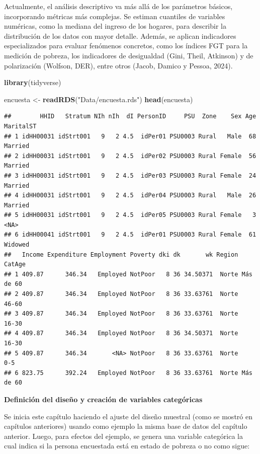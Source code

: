 \documentclass[
  spanish,
  12pt,
]{book}
\newenvironment{Shaded}{\begin{snugshade}}{\end{snugshade}}
\newcommand{\FunctionTok}[1]{\textcolor[rgb]{0.13,0.29,0.53}{\textbf{#1}}}
\newcommand{\NormalTok}[1]{#1}
\newcommand{\OtherTok}[1]{\textcolor[rgb]{0.56,0.35,0.01}{#1}}
\newcommand{\StringTok}[1]{\textcolor[rgb]{0.31,0.60,0.02}{#1}}
\begin{document}
Actualmente, el análisis descriptivo va más allá de los parámetros básicos, incorporando métricas más complejas. Se estiman cuantiles de variables numéricas, como la mediana del ingreso de los hogares, para describir la distribución de los datos con mayor detalle. Además, se aplican indicadores especializados para evaluar fenómenos concretos, como los índices FGT para la medición de pobreza, los indicadores de desigualdad (Gini, Theil, Atkinson) y de polarización (Wolfson, DER), entre otros (Jacob, Damico y Pessoa, 2024).

\begin{Shaded}
\begin{Highlighting}[]
\FunctionTok{library}\NormalTok{(tidyverse)}

\NormalTok{encuesta }\OtherTok{\textless{}{-}} \FunctionTok{readRDS}\NormalTok{(}\StringTok{"Data/encuesta.rds"}\NormalTok{)}
\FunctionTok{head}\NormalTok{(encuesta)}
\end{Highlighting}
\end{Shaded}

\begin{verbatim}
##        HHID   Stratum NIh nIh  dI PersonID     PSU  Zone    Sex Age MaritalST
## 1 idHH00031 idStrt001   9   2 4.5  idPer01 PSU0003 Rural   Male  68   Married
## 2 idHH00031 idStrt001   9   2 4.5  idPer02 PSU0003 Rural Female  56   Married
## 3 idHH00031 idStrt001   9   2 4.5  idPer03 PSU0003 Rural Female  24   Married
## 4 idHH00031 idStrt001   9   2 4.5  idPer04 PSU0003 Rural   Male  26   Married
## 5 idHH00031 idStrt001   9   2 4.5  idPer05 PSU0003 Rural Female   3      <NA>
## 6 idHH00041 idStrt001   9   2 4.5  idPer01 PSU0003 Rural Female  61   Widowed
##   Income Expenditure Employment Poverty dki dk       wk Region    CatAge
## 1 409.87      346.34   Employed NotPoor   8 36 34.50371  Norte Más de 60
## 2 409.87      346.34   Employed NotPoor   8 36 33.63761  Norte     46-60
## 3 409.87      346.34   Employed NotPoor   8 36 33.63761  Norte     16-30
## 4 409.87      346.34   Employed NotPoor   8 36 34.50371  Norte     16-30
## 5 409.87      346.34       <NA> NotPoor   8 36 33.63761  Norte       0-5
## 6 823.75      392.24   Employed NotPoor   8 36 33.63761  Norte Más de 60
\end{verbatim}

\textbf{Definición del diseño y creación de variables categóricas}

Se inicia este capítulo haciendo el ajuste del diseño muestral (como se mostró en capítulos anteriores) usando como ejemplo la misma base de datos del capítulo anterior. Luego, para efectos del ejemplo, se genera una variable categórica la cual indica si la persona encuestada está en estado de pobreza o no como sigue:
\end{document}
